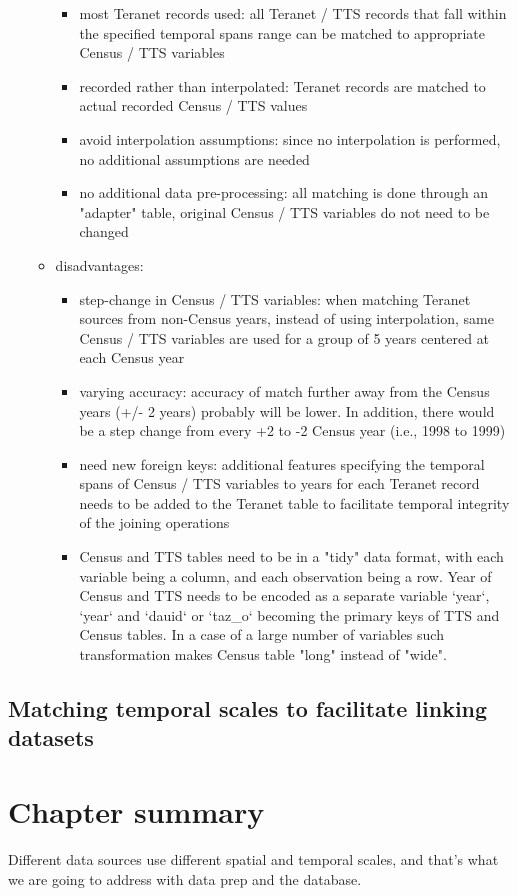 \begin{enumerate}
\begin{itemize}
\begin{itemize}
            \item most Teranet records used: all Teranet / TTS records that fall within the specified temporal spans range can be matched to appropriate Census / TTS variables
            \item recorded rather than interpolated: Teranet records are matched to actual recorded Census / TTS values
            \item avoid interpolation assumptions: since no interpolation is performed, no additional assumptions are needed
            \item no additional data pre-processing: all matching is done through an "adapter" table, original Census / TTS variables do not need to be changed
        \end{itemize}
        \item disadvantages:
        \begin{itemize}
            \item step-change in Census / TTS variables: when matching Teranet sources from non-Census years, instead of using interpolation, same Census / TTS variables are used for a group of 5 years centered at each Census year
            \item varying accuracy: accuracy of match further away from the Census years (+/- 2 years) probably will be lower.
            In addition, there would be a step change from every +2 to -2 Census year (i.e., 1998 to 1999)
            \item need new foreign keys: additional features specifying the temporal spans of Census / TTS variables to years for each Teranet record needs to be added to the Teranet table to facilitate temporal integrity of the joining operations
            \item Census and TTS tables need to be in a "tidy" data format, with each variable being a column, and each observation being a row.
            Year of Census and TTS needs to be encoded as a separate variable `year`, `year` and `dauid` or `taz\_o` becoming the primary keys of TTS and Census tables.
            In a case of a large number of variables such transformation makes Census table "long" instead of "wide".
        \end{itemize}
    \end{itemize}
\end{enumerate}


\subsection{Matching temporal scales to facilitate linking datasets} \label{subsec:matching_temporal_scales}

\section{Chapter summary} \label{sec:data_sources_summary}
Different data sources use different spatial and temporal scales, and that's what we are going to address with data prep and the database.
